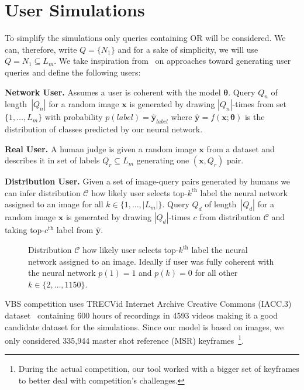 \section{User Simulations}
To simplify the simulations only queries containing \textsf{OR} will be considered. We can, therefore, write $Q=\{N_1\}$ and for a sake of simplicity, we will use $Q=N_1\subseteq L_m$.
We take inspiration from~\cite{kovalvcik2017comparison} on approaches toward generating user queries and define the following users:
\begin{description}[labelwidth=1em, leftmargin=!]
	\item \textbf{Network User.} Assumes a user is coherent with the model $\bm{\theta}$. Query $Q_{n}$ of length~$|Q_{n}|$ for a random image $\bm{x}$ is generated by drawing $|Q_{n}|$-times from set $\{1,\dots,L_m\}$ with probability $p(label)=\bm{\hat{y}}_{label}$ where $\bm{\hat{y}}=f\left(\bm{x}; \bm{\theta}\right)$ is the distribution of classes predicted by our neural network.
	\item \textbf{Real User.} A human judge is given a random image $\bm{x}$ from a dataset and describes it in set of labels $Q_r\subseteq L_m$ generating one $(\bm{x},Q_r)$ pair.
	\item \textbf{Distribution User.} Given a set of image-query pairs generated by humans we can infer distribution $\mathcal{C}$ how likely user selects top-$k^{\mathrm{th}}$ label the neural network assigned to an image for all $k\in\{1,\dots,|L_m|\}$.
	Query $Q_{d}$ of length~$|Q_{d}|$ for a random image $\bm{x}$ is generated by drawing $|Q_{d}|$-times $c$ from distribution $\mathcal{C}$ and taking top-$c^{\mathrm{th}}$ label from $\bm{\hat{y}}$.
\end{description}
\begin{figure}
	\centering
	
	
	\caption[Agreement between user and neural network labeling]{Distribution $\mathcal{C}$ how likely user selects top-$k^{\mathrm{th}}$ label the neural network assigned to an image. Ideally if user was fully coherent with the neural network $p(1)=1$ and $p(k)=0$ for all other $k\in\{2,\dots,1150\}$.
	}
	\label{fig:class_distribution}
\end{figure}
VBS competition uses TRECVid Internet Archive Creative Commons (IACC.3) dataset~\cite{awad2016trecvid} containing 600 hours of recordings in 4593 videos making it a good candidate dataset for the simulations. Since our model is based on images, we only considered 335,944 master shot reference (MSR) keyframes~\cite{MasterShotReference}\footnote{During the actual competition, our tool worked with a bigger set of keyframes to better deal with competition's challenges.}.

